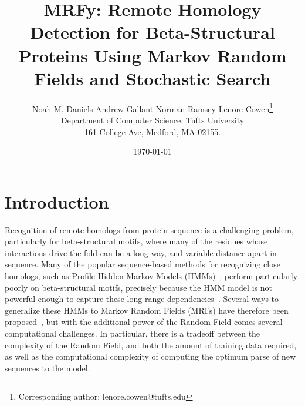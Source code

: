 \documentclass{acm_proc_article-sp}
\begin{document}
\title{MRFy: Remote Homology Detection for Beta-Structural Proteins
  Using Markov Random Fields and Stochastic Search}

\author{Noah M. Daniels \hspace*{8pt} Andrew Gallant \hspace*{8pt} Norman 
Ramsey \hspace*{8pt} 
Lenore Cowen\thanks{Corresponding author: lenore.cowen@tufts.edu}
\\ Department of Computer Science, Tufts University \\ 161 College Ave, 
Medford, MA 02155.}

\date{\today}

\maketitle




\begin{abstract}


\end{abstract} 




\section{Introduction}

Recognition of remote homologs from protein sequence is a challenging
problem, particularly for beta-structural motifs, where many of the
residues whose interactions drive the fold can be a long way, and
variable distance apart in sequence. Many of the popular
sequence-based methods for recognizing close homologs, such as Profile
Hidden Markov Models (HMMs)~\cite{blah,blah}, perform particularly poorly on
beta-structural motifs, precisely because the HMM model is not
powerful enough to capture these long-range dependencies~\cite{blah}. Several ways
to generalize these HMMs to Markov Random Fields (MRFs) have therefore
been proposed~\cite{blah,blah,blah}, but with the additional power of the Random Field comes
several computational challenges. In particular, there is a tradeoff
between the complexity of the Random Field, and both the amount of
training data required, as well as the computational complexity of
computing the optimum parse of new sequences to the model.
\end{document}
